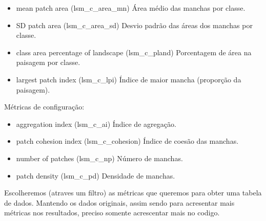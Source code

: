 \documentclass[
]{article}
\providecommand{\tightlist}{%
  \setlength{\itemsep}{0pt}\setlength{\parskip}{0pt}}
\begin{document}
\begin{itemize}
\tightlist
\item
  mean patch area (lsm\_c\_area\_mn) Área médio das manchas por classe.
\item
  SD patch area (lsm\_c\_area\_sd) Desvio padrão das áreas dos manchas por classe.
\item
  class area percentage of landscape (lsm\_c\_pland) Porcentagem de área na paisagem por classe.
\item
  largest patch index (lsm\_c\_lpi) Índice de maior mancha (proporção da paisagem).
\end{itemize}

Métricas de configuração:

\begin{itemize}
\tightlist
\item
  aggregation index (lsm\_c\_ai) Índice de agregação.
\item
  patch cohesion index (lsm\_c\_cohesion) Índice de coesão das manchas.
\item
  number of patches (lsm\_c\_np) Número de manchas.
\item
  patch density (lsm\_c\_pd) Densidade de manchas.
\end{itemize}

Escolheremos (atraves um filtro) as métricas que queremos para obter uma
tabela de dados. Mantendo os dados originais,
assim sendo para acresentar mais métricas nos resultados,
preciso somente acrescentar mais no codigo.
\end{document}
